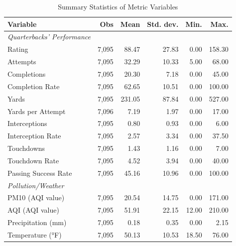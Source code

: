 \documentclass[12pt,a4paper]{article}
\begin{document}
\begin{table}[h]
  \centering
  \caption{Summary Statistics of Metric Variables}
  \label{tab:1}
  \begin{tabular}{lrrrrr}
    \hline \hline
    Variable & Obs & Mean & Std. dev. & Min. & Max. \\
    \hline
    \textit{Quarterbacks' Performance} \\
    Rating & 7,095 & 88.47 & 27.83 & 0.00 & 158.30 \\
    Attempts & 7,095 & 32.29 & 10.33 & 5.00 & 68.00 \\
    Completions & 7,095 & 20.30 & 7.18 & 0.00 & 45.00 \\
    Completion Rate & 7,095 & 62.65 & 10.51 & 0.00 & 100.00 \\
    Yards & 7,095 & 231.05 & 87.84 & 0.00 & 527.00 \\
    Yards per Attempt & 7,096 & 7.19 & 1.97 & 0.00 & 17.00 \\
    Interceptions & 7,095 & 0.80 & 0.93 & 0.00 & 6.00 \\
    Interception Rate & 7,095 & 2.57 & 3.34 & 0.00 & 37.50 \\
    Touchdowns & 7,095 & 1.43 & 1.16 & 0.00 & 7.00 \\
    Touchdown Rate & 7,095 & 4.52 & 3.94 & 0.00 & 40.00 \\
    Passing Success Rate & 7,095 & 45.16 & 10.96 & 0.00 & 100.00 \\ [0.5cm]
    \textit{Pollution/Weather} \\
    PM10 (AQI value) & 7,095 & 20.54 & 14.75 & 0.00 & 171.00 \\
    AQI (AQI value) & 7,095 & 51.91 & 22.15 & 12.00 & 210.00 \\
    Precipitation (mm) & 7,095 & 0.18 & 0.35 & 0.00 & 2.15 \\
    Temperature (°F) & 7,095 & 50.13 & 10.53 & 18.50 & 76.00 \\
    \hline \hline
  \end{tabular}
\end{table}
\end{document}
